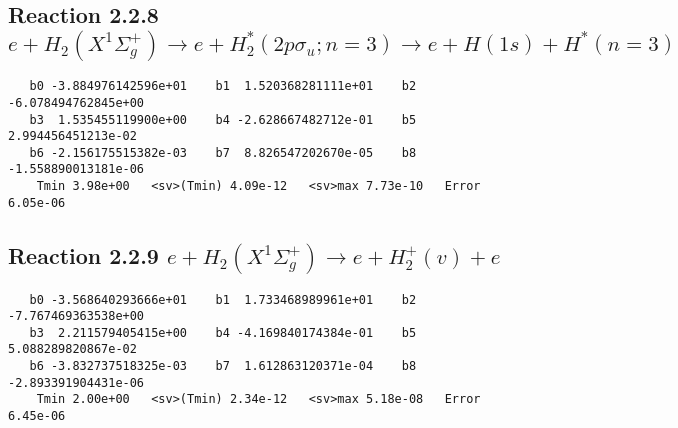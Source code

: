 \documentclass[12pt]{article}
\begin{document}
\newpage
\subsection{
Reaction 2.2.8 $e + H_2(X^1\Sigma_g^+) \rightarrow e + H_2^*(2p\sigma_u;n=3) \rightarrow e + H(1s) + H^*(n=3)$}














\begin{small}\begin{verbatim}
   b0 -3.884976142596e+01    b1  1.520368281111e+01    b2 -6.078494762845e+00
   b3  1.535455119900e+00    b4 -2.628667482712e-01    b5  2.994456451213e-02
   b6 -2.156175515382e-03    b7  8.826547202670e-05    b8 -1.558890013181e-06
    Tmin 3.98e+00   <sv>(Tmin) 4.09e-12   <sv>max 7.73e-10   Error 6.05e-06
\end{verbatim}\end{small}

\newpage
\subsection{
Reaction 2.2.9 $e + H_2(X^1\Sigma_g^+) \rightarrow e + H_2^+(v) + e$}














\begin{small}\begin{verbatim}
   b0 -3.568640293666e+01    b1  1.733468989961e+01    b2 -7.767469363538e+00
   b3  2.211579405415e+00    b4 -4.169840174384e-01    b5  5.088289820867e-02
   b6 -3.832737518325e-03    b7  1.612863120371e-04    b8 -2.893391904431e-06
    Tmin 2.00e+00   <sv>(Tmin) 2.34e-12   <sv>max 5.18e-08   Error 6.45e-06
\end{verbatim}\end{small}




                              
\end{document}
